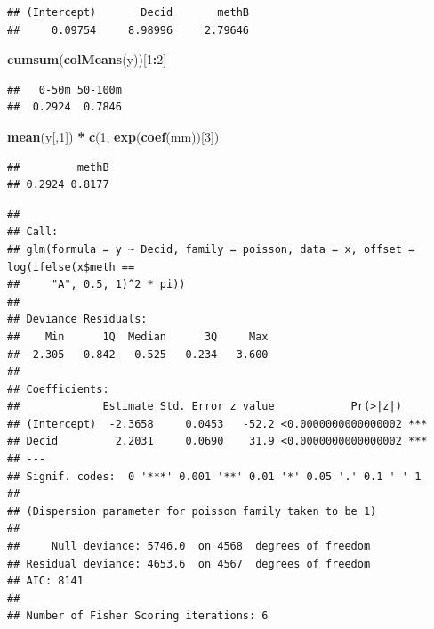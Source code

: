 \documentclass[12pt,]{book}
\newenvironment{Shaded}{\begin{snugshade}}{\end{snugshade}}
\newcommand{\DataTypeTok}[1]{\textcolor[rgb]{0.13,0.29,0.53}{#1}}
\newcommand{\DecValTok}[1]{\textcolor[rgb]{0.00,0.00,0.81}{#1}}
\newcommand{\FloatTok}[1]{\textcolor[rgb]{0.00,0.00,0.81}{#1}}
\newcommand{\KeywordTok}[1]{\textcolor[rgb]{0.13,0.29,0.53}{\textbf{#1}}}
\newcommand{\NormalTok}[1]{#1}
\newcommand{\OperatorTok}[1]{\textcolor[rgb]{0.81,0.36,0.00}{\textbf{#1}}}
\newcommand{\StringTok}[1]{\textcolor[rgb]{0.31,0.60,0.02}{#1}}
\begin{document}
\begin{verbatim}
## (Intercept)       Decid       methB 
##     0.09754     8.98996     2.79646
\end{verbatim}

\begin{Shaded}
\begin{Highlighting}[]
\KeywordTok{cumsum}\NormalTok{(}\KeywordTok{colMeans}\NormalTok{(y))[}\DecValTok{1}\OperatorTok{:}\DecValTok{2}\NormalTok{]}
\end{Highlighting}
\end{Shaded}

\begin{verbatim}
##   0-50m 50-100m 
##  0.2924  0.7846
\end{verbatim}

\begin{Shaded}
\begin{Highlighting}[]
\KeywordTok{mean}\NormalTok{(y[,}\DecValTok{1}\NormalTok{]) }\OperatorTok{*}\StringTok{ }\KeywordTok{c}\NormalTok{(}\DecValTok{1}\NormalTok{, }\KeywordTok{exp}\NormalTok{(}\KeywordTok{coef}\NormalTok{(mm))[}\DecValTok{3}\NormalTok{])}
\end{Highlighting}
\end{Shaded}

\begin{verbatim}
##         methB 
## 0.2924 0.8177
\end{verbatim}

\begin{Shaded}
\end{Shaded}

\begin{verbatim}
## 
## Call:
## glm(formula = y ~ Decid, family = poisson, data = x, offset = log(ifelse(x$meth == 
##     "A", 0.5, 1)^2 * pi))
## 
## Deviance Residuals: 
##    Min      1Q  Median      3Q     Max  
## -2.305  -0.842  -0.525   0.234   3.600  
## 
## Coefficients:
##             Estimate Std. Error z value            Pr(>|z|)    
## (Intercept)  -2.3658     0.0453   -52.2 <0.0000000000000002 ***
## Decid         2.2031     0.0690    31.9 <0.0000000000000002 ***
## ---
## Signif. codes:  0 '***' 0.001 '**' 0.01 '*' 0.05 '.' 0.1 ' ' 1
## 
## (Dispersion parameter for poisson family taken to be 1)
## 
##     Null deviance: 5746.0  on 4568  degrees of freedom
## Residual deviance: 4653.6  on 4567  degrees of freedom
## AIC: 8141
## 
## Number of Fisher Scoring iterations: 6
\end{verbatim}
\end{document}
